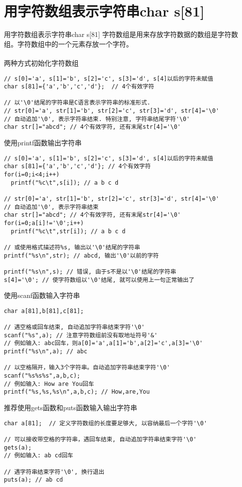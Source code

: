 \section{用字符数组表示字符串char s[81]}

\begin{frame}{用字符数组表示字符串char s[81]}
字符数组是用来存放字符数据的数组是字符数组。字符数组中的一个元素存放一个字符。\\
~\\
两种方式初始化字符数组
\begin{lstlisting}
// s[0]='a', s[1]='b', s[2]='c', s[3]='d', s[4]以后的字符未赋值
char s[81]={'a','b','c','d'};  // 4个有效字符

// 以'\0'结尾的字符串是C语言表示字符串的标准形式. 
// str[0]='a', str[1]='b', str[2]='c', str[3]='d', str[4]='\0'
// 自动追加'\0', 表示字符串结束. 特别注意, 字符串结尾字符'\0'
char str[]="abcd"; // 4个有效字符, 还有末尾str[4]='\0'
\end{lstlisting}
\end{frame}

\begin{frame}{使用printf函数输出字符串}
\vspace{-0.3cm}
\begin{lstlisting}
// s[0]='a', s[1]='b', s[2]='c', s[3]='d', s[4]以后的字符未赋值
char s[81]={'a','b','c','d'}; // 4个有效字符
for(i=0;i<4;i++)
  printf("%c\t",s[i]); // a b c d

// str[0]='a', str[1]='b', str[2]='c', str[3]='d', str[4]='\0'
// 自动追加'\0', 表示字符串结束
char str[]="abcd"; // 4个有效字符, 还有末尾str[4]='\0'
for(i=0;a[i]!='\0';i++)
  printf("%c\t",str[i]); // a b c d

// 或使用格式描述符%s, 输出以'\0'结尾的字符串
printf("%s\n",str); // abcd, 输出'\0'以前的字符

printf("%s\n",s); // 错误, 由于s不是以'\0'结尾的字符串
s[4]='\0'; // 使字符数组以'\0'结尾, 就可以使用上一句正常输出了
\end{lstlisting}
\end{frame}

\begin{frame}{使用scanf函数输入字符串}
\begin{lstlisting}
char a[81],b[81],c[81];

// 遇空格或回车结束, 自动追加字符串结束字符'\0'
scanf("%s",a); // 注意字符数组前没有取地址符号'&'
// 例如输入: abc回车，则a[0]='a',a[1]='b',a[2]='c',a[3]='\0'
printf("%s\n",a); // abc

// 以空格隔开，输入3个字符串。自动追加字符串结束字符'\0'
scanf("%s%s%s",a,b,c); 
// 例如输入: How are You回车
printf("%s,%s,%s\n",a,b,c); // How,are,You
\end{lstlisting}
\end{frame}

\begin{frame}{推荐使用gets函数和puts函数输入输出字符串}
\begin{lstlisting}
char a[81];  // 定义字符数组的长度要足够大, 以容纳最后一个字符'\0'

// 可以接收带空格的字符串，遇回车结束, 自动追加字符串结束字符'\0'
gets(a);
// 例如输入: ab cd回车

// 遇字符串结束字符'\0', 换行退出
puts(a); // ab cd
\end{lstlisting}
\end{frame}




